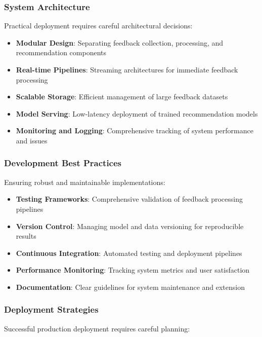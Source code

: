 \subsubsection{System Architecture}

Practical deployment requires careful architectural decisions:

\begin{itemize}
    \item \textbf{Modular Design}: Separating feedback collection, processing, and recommendation components
    \item \textbf{Real-time Pipelines}: Streaming architectures for immediate feedback processing
    \item \textbf{Scalable Storage}: Efficient management of large feedback datasets
    \item \textbf{Model Serving}: Low-latency deployment of trained recommendation models
    \item \textbf{Monitoring and Logging}: Comprehensive tracking of system performance and issues
\end{itemize}

\subsubsection{Development Best Practices}

Ensuring robust and maintainable implementations:

\begin{itemize}
    \item \textbf{Testing Frameworks}: Comprehensive validation of feedback processing pipelines
    \item \textbf{Version Control}: Managing model and data versioning for reproducible results
    \item \textbf{Continuous Integration}: Automated testing and deployment pipelines
    \item \textbf{Performance Monitoring}: Tracking system metrics and user satisfaction
    \item \textbf{Documentation}: Clear guidelines for system maintenance and extension
\end{itemize}

\subsubsection{Deployment Strategies}

Successful production deployment requires careful planning:

